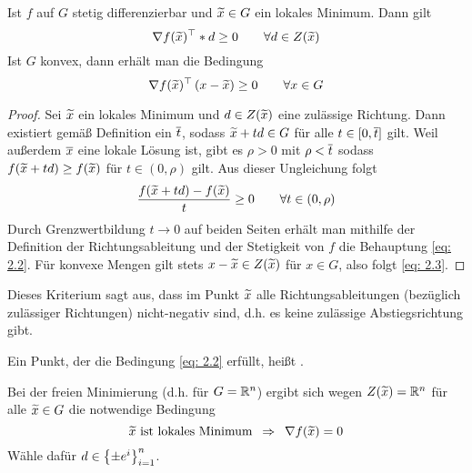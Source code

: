 \begin{aussage} %
	\label{aussage: 2.4}
	Ist $f$ auf $G$ stetig differenzierbar und $\widetilde{x} \in G$ ein lokales Minimum. Dann gilt
	\begin{equation} \label{eq: 2.2}
	\nabla f(\widetilde{x})^{\top} * d \ge 0 \qquad \forall d \in Z(\widetilde{x})
	\end{equation}
	Ist $G$ konvex, dann erhält man die Bedingung
	\begin{equation} \label{eq: 2.3}
	\nabla f(\widetilde{x})^{\top} \left( x - \widetilde{x} \right) \ge 0 \qquad \forall x \in G
	\end{equation}
\end{aussage}
\begin{proof}
	Sei $\widetilde{x}$ ein lokales Minimum und $d \in Z(\widetilde{x})$ eine zulässige Richtung. Dann existiert gemäß Definition ein $\overline{t}$, sodass $\widetilde{x} + td \in G$ für alle $t \in [0,\overline{t}]$ gilt. Weil außerdem $\overline{x}$ eine lokale Lösung ist, gibt es $\rho > 0$ mit $\rho < \overline{t}$ sodass $f(\widetilde{x} + td) \ge f(\widetilde{x})$ für $t \in (0,\rho)$ gilt. Aus dieser Ungleichung folgt
	\begin{equation*}
	\frac{f(\widetilde{x} + td) - f(\widetilde{x})}{t} \ge 0 \qquad \forall t \in (0,\rho)
	\end{equation*}
	Durch Grenzwertbildung $t \to 0$ auf beiden Seiten erhält man mithilfe der Definition der Richtungsableitung und der Stetigkeit von $f$ die Behauptung \eqref{eq: 2.2}.
	Für konvexe Mengen gilt stets $x - \widetilde{x} \in Z(\widetilde{x})$ für $x \in G$, also folgt \eqref{eq: 2.3}.
\end{proof}

Dieses Kriterium sagt aus, dass im Punkt $\widetilde{x}$ alle Richtungsableitungen (bezüglich zulässiger Richtungen) nicht-negativ sind, d.h. es keine zulässige Abstiegsrichtung gibt.

\begin{bemerkung} %
	Ein Punkt, der die Bedingung \eqref{eq: 2.2} erfüllt, heißt .
\end{bemerkung}

\begin{bemerkung} %
	\label{bemerkung: 2.3}
	Bei der freien Minimierung (d.h. für $G = \mathbb{R}^n$) ergibt sich wegen $Z(\widetilde{x}) = \mathbb{R}^n$ für alle $\widetilde{x} \in G$ die notwendige Bedingung
	\begin{equation*}
	\widetilde{x} \text{ ist lokales Minimum} \enskip \Rightarrow \enskip \nabla f(\widetilde{x}) = 0
	\end{equation*}
	Wähle dafür $d \in \left\{ \pm e^i \right\}_{i=1}^n$.
\end{bemerkung}

